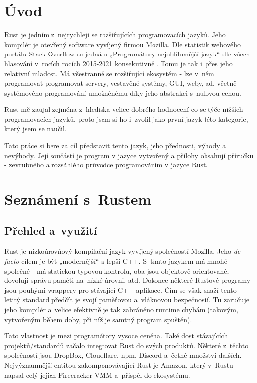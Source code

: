 \documentclass[a4paper, 12pt, twoside]{article} %
\begin{document}
\tableofcontents

\newpage


\section*{Úvod}
	Rust je jedním z~nejrychleji se rozšiřujících programovacích jazyků. Jeho kompilér je otevřený software vyvíjený firmou Mozilla. Dle statistik webového portálu \href{https://stackoverflow.com/}{Stack Overflow} se jedná o  „Programátory nejoblíbenější jazyk“ dle všech hlasování v~rocích rocích 2015-2021 konsekutivně \cite{stack}. Tomu je tak i~přes jeho relativní mladost. Má všestranně se rozšiřující ekosystém - lze v~něm programovat programovat servery, vestavěné systémy, GUI, weby, ad. včetně systémového programování umožnénému díky jeho abstrakci s~nulovou cenou.

	Rust mě zaujal zejména z~hlediska velice dobrého hodnocení co se týče nižších programovacích jazyků, proto jsem si ho i~zvolil jako první jazyk této kategorie, který jsem se naučil.
	
	Tato práce si bere za cíl představit tento jazyk, jeho přednosti, výhody a nevýhody. Její součástí je program v jazyce vytvořený a přílohy obsahují příručku - zevrubného a rozsáhlého průvodce programováním v jazyce Rust.

\section*{Seznámení s~Rustem}
	\subsection{Přehled a~využití}
		Rust je nízkoúrovňový kompilační jazyk vyvíjený společností Mozilla. Jeho \textit{de facto} cílem je být „modernější“ a lepší C++. S~tímto jazykem má mnohé společné - má statickou typovou kontrolu, oba jsou objektově orientované, dovolují správu paměti na~nízké úrovni, atd. Dokonce některé Rustové programy jsou pouhými wrappery pro stávající C++ aplikace. Čím se však snaží tento letitý standard předčít je svojí paměťovou a~vláknovou bezpečností. Tu zaručuje jeho kompilér a~velice efektivně je tak zabráněno runtime chybám (takovým, vytvořeným během doby, při níž je samtný program spuštěn). 

		Tato vlastnost je mezi programátory vysoce ceněna. Také dost stávajících projektů/standardů začalo integrovat Rust do svých produktů. Některé z~těchto společností jsou DropBox\cite{dropbox}, Cloudflare\cite{cloudflare}, npm\cite{npm}, Discord\cite{discord} a~četné množství dalších. Nejvýznamnější entitou zakomponovávající Rust je Amazon\cite{amazon}, který v~Rustu napsal celý jejich Firecracker VMM a~přispěl do ekosystému.
\end{document}
